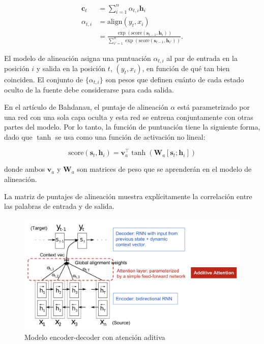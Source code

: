 \documentclass[conference]{IEEEtran}
\begin{document}
\begin{align*}
	\mathbf{c}_t &= \sum_{i=1}^n \alpha_{t,i} \boldsymbol{h}_i \\
	\alpha_{t,i} &= \text{align}(y_t, x_i) \\
	&= \frac{\exp(\text{score}(\boldsymbol{s}_{t-1}, \boldsymbol{h}_i))}{\sum_{i'=1}^n \exp(\text{score}(\boldsymbol{s}_{t-1}, \boldsymbol{h}_{i'}))}.
\end{align*}


El modelo de alineaci\'on asigna una puntuaci\'on $\alpha_{t,i}$ al par de entrada en la posici\'on $i$ y salida en la posici\'on $t$, $(y_t, x_i)$, en funci\'on de qu\'e tan bien coinciden. El conjunto de $\{\alpha_{t, i}\}$ son pesos que definen cu\'anto de cada estado oculto de la fuente debe considerarse para cada salida.

\vspace{0.2cm}

En el art\'iculo de Bahdanau, el puntaje de alineaci\'on $\alpha$ est\'a parametrizado por una red  con una sola capa oculta y esta red se entrena conjuntamente con otras partes del modelo. Por lo tanto, la funci\'on de puntuaci\'on tiene la siguiente forma, dado que $\tanh$ se usa como una funci\'on de activaci\'on no lineal:

\[
\text{score}(\boldsymbol{s}_t, \boldsymbol{h}_i) = \mathbf{v}_a^\top \tanh(\mathbf{W}_a[\boldsymbol{s}_t; \boldsymbol{h}_i])
\]

donde ambos $\mathbf{v}_a$ y $\mathbf{W}_a$ son matrices de peso que se aprender\'an en el modelo de alineaci\'on.

La matriz de puntajes de alineaci\'on muestra expl\'icitamente la correlaci\'on entre las palabras de entrada y de salida.


\begin{figure}[h]
	\centering
	\includegraphics[scale=.28]{imagenes/encoder-decoder-attention.png}
	\caption{Modelo encoder-decoder con atenci\'on aditiva} 
\end{figure}
\end{document}

